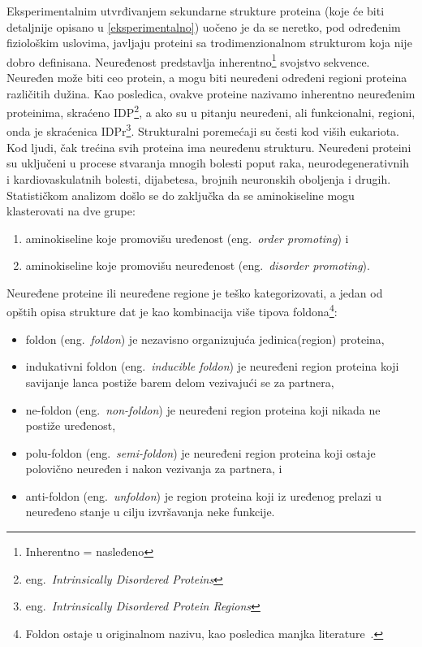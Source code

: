 Eksperimentalnim utvrđivanjem sekundarne strukture proteina (koje će biti detaljnije opisano u \ref{eksperimentalno}) uočeno je da se neretko, pod određenim fiziološkim uslovima, javljaju proteini sa trodimenzionalnom strukturom koja nije dobro definisana.
Neuređenost predstavlja inherentno\footnote{Inherentno = nasleđeno} svojstvo sekvence. Neuređen može biti ceo protein, a mogu biti neuređeni određeni regioni proteina različitih dužina. Kao posledica, ovakve proteine nazivamo inherentno neuređenim proteinima, skraćeno IDP\footnote{eng.~{\em Intrinsically Disordered Proteins}}, a ako su u pitanju neuređeni, ali funkcionalni, regioni, onda je skraćenica IDPr\footnote{eng.~{\em Intrinsically Disordered Protein Regions}}. Strukturalni poremećaji su česti kod viših eukariota. Kod ljudi, čak trećina svih proteina ima neuređenu strukturu. Neuređeni proteini su uključeni u procese stvaranja mnogih bolesti poput raka, neurodegenerativnih i kardiovaskulatnih bolesti, dijabetesa, brojnih neuronskih oboljenja i drugih. Statističkom analizom došlo se do zaključka da se aminokiseline mogu klasterovati na dve grupe: 
\begin{enumerate}
\item aminokiseline koje promovišu uređenost (eng.~{\em order promoting}) i
\item aminokiseline koje promovišu neuređenost (eng.~{\em disorder promoting}).
\end{enumerate}
Neuređene proteine ili neuređene regione je teško kategorizovati, a jedan od opštih opisa strukture dat je kao kombinacija više tipova foldona\footnote{Foldon ostaje u originalnom nazivu, kao posledica manjka literature~\cite{Vinterhalter}.}:
\begin{itemize}
\item foldon (eng.~{\em foldon}) je nezavisno organizujuća jedinica(region) proteina,
\item indukativni foldon (eng.~{\em inducible foldon}) je neuređeni region proteina koji savijanje lanca postiže barem delom vezivajući se za partnera,
\item ne-foldon (eng.~{\em non-foldon}) je neuređeni region proteina koji nikada ne postiže uređenost,
\item polu-foldon (eng.~{\em semi-foldon}) je neuređeni region proteina koji ostaje polovično neuređen i nakon vezivanja za partnera, i 
\item anti-foldon (eng.~{\em unfoldon}) je region proteina koji iz uređenog prelazi u neuređeno stanje u cilju izvršavanja neke funkcije.
\end{itemize}

